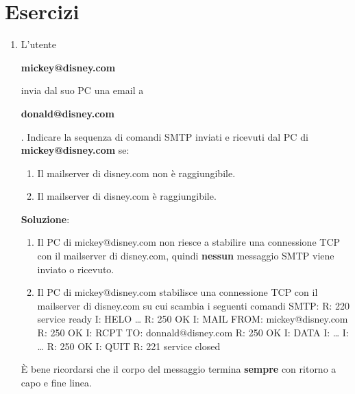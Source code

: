 \documentclass[11pt,a4paper,oneside]{book}
\theoremstyle{definition}
\begin{document}
\pagebreak

\section{Esercizi}
\begin{enumerate}
	\item L’utente \begin{center}
		      \textbf{mickey@disney.com}
	      \end{center} invia dal suo PC una email a \begin{center}
		      \textbf{donald@disney.com}
	      \end{center}. Indicare la sequenza di comandi SMTP inviati e ricevuti dal PC di \textbf{mickey@disney.com} se:
	      \begin{enumerate}
		      \item Il mailserver di disney.com non è raggiungibile.
		      \item Il mailserver di disney.com è raggiungibile.
	      \end{enumerate}
	      \textbf{Soluzione}:
	      \begin{enumerate}
		      \item Il PC di mickey@disney.com non riesce a stabilire una connessione TCP con il mailserver di disney.com, quindi \textbf{nessun} messaggio SMTP viene inviato o ricevuto.
		      \item  Il PC di mickey@disney.com stabilisce una connessione TCP con il mailserver di
		            disney.com su cui scambia i seguenti comandi SMTP:\newline
		            R: 220 service ready \newline
		            I: HELO …\newline
		            R: 250 OK\newline
		            I: MAIL FROM: mickey@disney.com\newline
		            R: 250 OK \newline
		            I: RCPT TO: donnald@disney.com\newline
		            R: 250 OK \newline
		            I: DATA\newline
		            I: …\newline
		            I: …\newline
		            R: 250 OK\newline
		            I: QUIT\newline
		            R: 221 service closed\newline
	      \end{enumerate}
	      È bene ricordarsi che il corpo del messaggio termina \textbf{sempre} con ritorno a capo e fine linea.


\end{enumerate}
\end{document}
